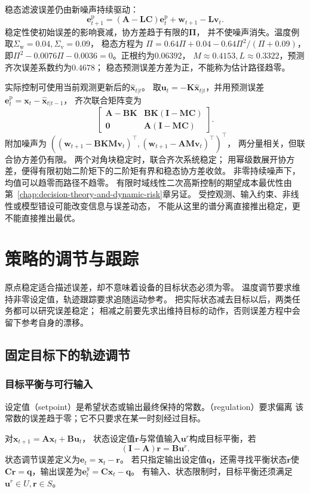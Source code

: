 稳态滤波误差仍由新噪声持续驱动：
\[
  \bm e_{t+1}^{\mathrm p}
  =(\bm A-\bm L\bm C)\bm e_t^{\mathrm p}
     +\bm w_{t+1}-\bm L\bm v_t.
\]
稳定性使初始误差的影响衰减，协方差趋于有限的$\bm\Pi$，
并不使噪声消失。温度例取$\Sigma_{\mathrm w}=0.04,\Sigma_{\mathrm v}=0.09$，
稳态方程为
$\Pi=0.64\Pi+0.04-0.64\Pi^2/(\Pi+0.09)$，
即$\Pi^2-0.0076\Pi-0.0036=0$。正根约为$0.06392$，
$M\approx0.4153,L\approx0.3322$，预测齐次误差系数约为$0.4678$；
稳态预测误差方差为正，不能称为估计路径趋零。

实际控制可使用当前观测更新后的$\widehat{\bm x}_{t|t}$。
取$\bm u_t=-\bm K\widehat{\bm x}_{t|t}$，并用预测误差
$\bm e_t^{\mathrm p}=\bm x_t-\widehat{\bm x}_{t|t-1}$，
齐次联合矩阵变为
\[
  \begin{bmatrix}
    \bm A-\bm B\bm K&\bm B\bm K(\bm I-\bm M\bm C)\\
    \bm0&\bm A(\bm I-\bm M\bm C)
  \end{bmatrix}.
\]
附加噪声为
$((\bm w_{t+1}-\bm B\bm K\bm M\bm v_t)^\top,
  (\bm w_{t+1}-\bm A\bm M\bm v_t)^\top)^\top$，
两分量相关，但联合协方差仍有限。
两个对角块稳定时，联合齐次系统稳定；
用幂级数展开协方差，便得有限初始二阶矩下的二阶矩有界和稳态协方差收敛。
非零持续噪声下，均值可以趋零而路径不趋零。
有限时域线性二次高斯控制的期望成本最优性由
第~\ref{chap:decision-theory-and-dynamic-risk}章另证。
受控观测、输入约束、非线性或模型错设可能改变信息与误差动态，
不能从这里的谱分离直接推出稳定，更不能直接推出最优。

\section{策略的调节与跟踪}
\label{sec:control-regulation-tracking}

原点稳定适合描述误差，却不意味着设备的目标状态必须为零。
温度调节要求维持非零设定值，轨迹跟踪要求追随运动参考。
把实际状态减去目标以后，两类任务都可以研究误差稳定；
相减之前要先求出维持目标的动作，否则误差方程中会留下参考自身的漂移。

\subsection{固定目标下的轨迹调节}
\subsubsection{目标平衡与可行输入}
设定值（setpoint）是希望状态或输出最终保持的常数。（regulation）要求偏离
该常数的误差趋于零；它不只要求在某一时刻经过目标。
\begin{definition}[目标平衡与调节误差]
\label{def:control-regulation-equilibrium}
对$\bm x_{t+1}=\bm A\bm x_t+\bm B\bm u_t$，
状态设定值$\bm r$与常值输入$\bm u^r$构成目标平衡，若
\begin{equation}
  (\bm I-\bm A)\bm r=\bm B\bm u^r.
  \label{eq:control-target-equilibrium}
\end{equation}
状态调节误差定义为$\bm e_t=\bm x_t-\bm r$。
若只指定输出设定值$\bm q$，还需寻找平衡状态$\bm r$使
$\bm C\bm r=\bm q$，输出误差为$\bm e_t^y=\bm C\bm x_t-\bm q$。
有输入、状态限制时，目标平衡还须满足$\bm u^r\in U,\bm r\in S$。
\end{definition}

